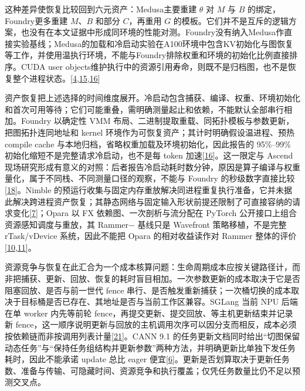 \documentclass[
  UTF8,
  zihao=5]{ctexart}
\begin{document}
这种差异使恢复比较回到六元资产：Medusa主要重建 \(\theta\) 对 \(M\) 与
\(B\) 的绑定，Foundry更多重建 \(M\)、\(B\) 和部分 \(C\)，再重用 \(G\)
的模板。它们并不是互斥的逻辑方案，也没有在本文证据中形成同环境的性能对测。Foundry没有纳入Medusa作直接实验基线；Medusa的加载和冷启动实验在A100环境中包含KV初始化与图恢复等工作，并使用温执行环境，不能与Foundry排除权重和环境的初始化比例直接排序。CUDA
user
objects维护执行中的资源引用寿命，则既不是归档图，也不是恢复整个进程状态。{[}\protect\hyperlink{ref-nvidia2025cudaguide}{4},\protect\hyperlink{ref-zeng2025medusa}{15},\protect\hyperlink{ref-liu2026foundry}{16}{]}

资产恢复把上述选择的时间维度展开。冷启动包含捕获、编译、权重、环境初始化和首次可用等待；它们可能重叠，需明确测量起止和依赖，不能默认全部串行相加。Foundry
以确定性 VMM
布局、二进制提取重载、同拓扑模板与参数更新，把图拓扑连同地址和 kernel
环境作为可恢复资产；其计时明确假设温进程、预热 compile cache
与本地归档，省略权重加载及环境初始化，因此报告的 95\%--99\%
初始化缩短不是完整请求冷启动，也不是每 token
加速{[}\protect\hyperlink{ref-liu2026foundry}{16}{]}。这一限定与 Ascend
现场研究形成有意义的对照：后者报告冷启动耗时数分钟，原因是算子编译与权重量化，属于不同栈、不同测量口径的观察，不能与
Foundry
的秒级数字直接比较{[}\protect\hyperlink{ref-yu2026ascendfield}{18}{]}。Nimble
的预运行收集与固定内存重放解决同进程重复执行准备，它并未据此解决跨进程资产恢复；其静态网络与固定输入形状前提还限制了可直接容纳的请求变化{[}\protect\hyperlink{ref-kwon2020nimble}{7}{]}；Opara
以 FX 依赖图、一次剖析与流分配在 PyTorch
公开接口上组合资源感知调度与重放，其 Rammer− 基线只是 Wavefront
策略移植，不是完整 rTask/vDevice 系统，因此不能把 Opara 的相对收益读作对
Rammer
整体的评价{[}\protect\hyperlink{ref-chen2025opara}{10},\protect\hyperlink{ref-ma2020rammer}{11}{]}。

资源竞争与恢复在此汇合为一个成本核算问题：生命周期成本应按关键路径计，而非把捕获、更新、回放、恢复的耗时盲目相加。一次参数更新的成本取决于它是否阻塞回放、是否与前一世代
fence
串行、是否触发重新捕获；一次桶切换的成本取决于目标桶是否已存在、其地址是否与当前工作区兼容。SGLang
当前 NPU 后端在单 worker 内先等前轮
fence，再提交更新、提交回放、等主机更新结束并记录新
fence，这一顺序说明更新与回放的主机调用次序可以因分支而相反，成本必须按依赖链而非按调用列表计量{[}\protect\hyperlink{ref-sglang2026impl}{21}{]}。CANN
9.1
的任务更新文档同时给出``切图保留动态任务''与``保持任务组结构并更新参数''两种方法，并明确更新比单独下发任务耗时，因此不能承诺
update 总比 eager
便宜{[}\protect\hyperlink{ref-cann910update}{6}{]}。更新是否划算取决于更新任务数、准备与传输、可隐藏时间、资源竞争和执行覆盖；仅凭任务数量比仍不足以预测交叉点。
\end{document}
